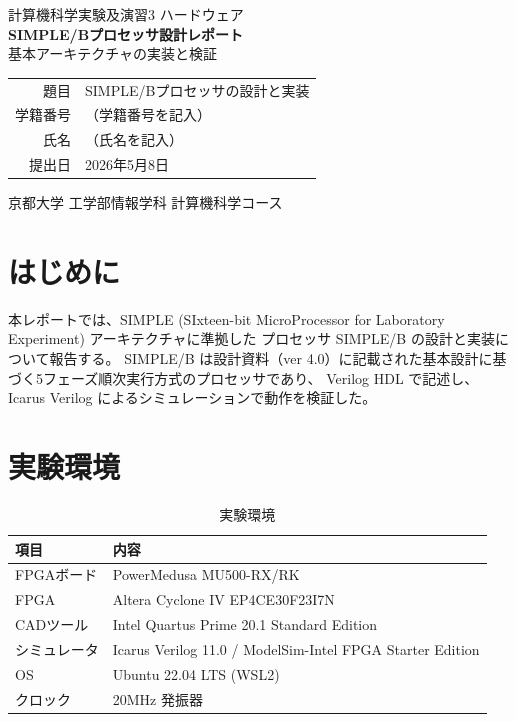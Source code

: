 \documentclass[a4paper,11pt]{ltjsarticle}
\begin{document}
\begin{titlepage}
\centering
\vspace*{3cm}
{\LARGE 計算機科学実験及演習3 ハードウェア}\\[1cm]
{\Huge\bfseries SIMPLE/Bプロセッサ設計レポート}\\[0.5cm]
{\LARGE 基本アーキテクチャの実装と検証}\\[3cm]

\begin{tabular}{rl}
題目   & SIMPLE/Bプロセッサの設計と実装 \\[0.5em]
学籍番号 & （学籍番号を記入） \\[0.5em]
氏名   & （氏名を記入） \\[0.5em]
提出日  & 2026年5月8日 \\
\end{tabular}

\vfill
京都大学 工学部情報学科 計算機科学コース
\end{titlepage}

\tableofcontents
\clearpage

\section{はじめに}

本レポートでは、SIMPLE (SIxteen-bit MicroProcessor for Laboratory Experiment) アーキテクチャに準拠した
プロセッサ SIMPLE/B の設計と実装について報告する。
SIMPLE/B は設計資料（ver 4.0）に記載された基本設計に基づく5フェーズ順次実行方式のプロセッサであり、
Verilog HDL で記述し、Icarus Verilog によるシミュレーションで動作を検証した。

\section{実験環境}

\begin{table}[h]
\centering
\caption{実験環境}
\label{tab:env}
\begin{tabular}{ll}
\toprule
項目 & 内容 \\
\midrule
FPGAボード    & PowerMedusa MU500-RX/RK \\
FPGA          & Altera Cyclone IV EP4CE30F23I7N \\
CADツール     & Intel Quartus Prime 20.1 Standard Edition \\
シミュレータ  & Icarus Verilog 11.0 / ModelSim-Intel FPGA Starter Edition \\
OS            & Ubuntu 22.04 LTS (WSL2) \\
クロック      & 20MHz 発振器 \\
\bottomrule
\end{tabular}
\end{table}
\end{document}
